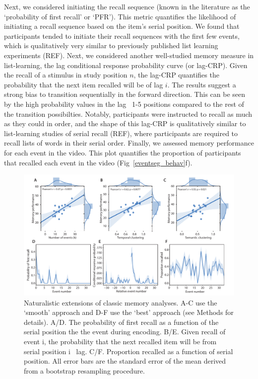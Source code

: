 \documentclass[a4paper,man,natbib,floatsintext]{apa6}
\newcommand{\rpm}{\raisebox{.2ex}{$\scriptstyle\pm$}}
\begin{document}
Next, we considered initiating the recall sequence (known in the literature as the `probability of first recall' or `PFR'). This metric quantifies the likelihood of initiating a recall sequence based on the item's serial position. We found that participants tended to initiate their recall sequences with the first few events, which is qualitatively very similar to previously published list learning experiments (REF).  Next, we considered another well-studied memory measure in list-learning, the lag conditional response probability curve (or lag-CRP). Given the recall of a stimulus in study position $n$, the lag-CRP quantifies the probability that the next item recalled will be of lag $i$. The results suggest a strong bias to transition sequentially in the forward direction. This can be seen by the high probability values in the lag ~1-5 positions compared to the rest of the transition possibilties. Notably, participants were instructed to recall as much as they could in order, and the shape of this lag-CRP is qualitatively similar to list-learning studies of serial recall (REF), where participants are required to recall lists of words in their serial order. Finally, we assessed memory performance for each event in the video. This plot quantifies the proportion of participants that recalled each event in the video (Fig~\ref{eventseg_behav}f).

\begin{figure}[t!]
\centering
\includegraphics[width=1\textwidth]{figs/4_behav_eventseg.pdf}
\caption{\label{fig:behav}Naturalistic extensions of classic memory analyses. A-C use the `smooth' approach and D-F use the `best' approach (see Methods for details). A/D. The probability of first recall as a function of the serial position the the event during encoding. B/E. Given recall of event i, the probability that the next recalled item will be from serial position i \rpm~lag. C/F. Proportion recalled as a function of serial position. All error bars are the standard error of the mean derived from a bootstrap resampling procedure.
}
\end{figure}
\end{document}

